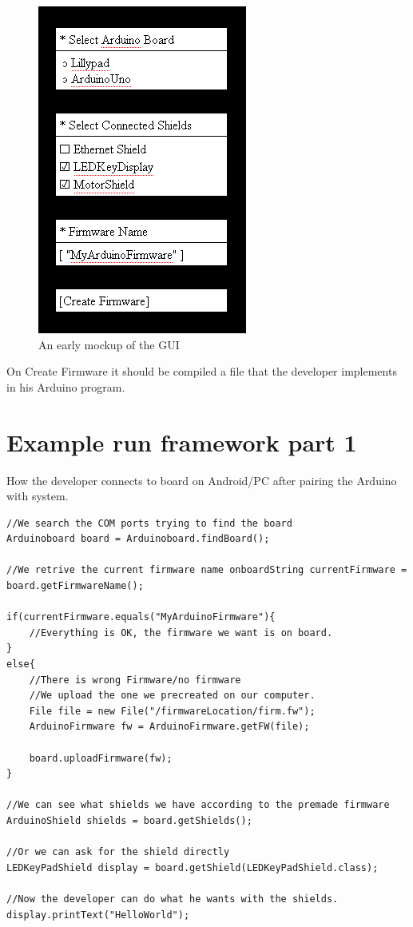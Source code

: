 \begin{figure}
	\centering
	\includegraphics{./img/architecture-mockupgui.png}
	\caption{An early mockup of the GUI}
	\label{fig:architecture-mockupgui}
\end{figure}

On Create Firmware it should be compiled a file that the developer implements in his Arduino program.

\section{Example run framework part 1}

How the developer connects to board on Android/PC after pairing the Arduino with system.

\javacode
\begin{lstlisting}
//We search the COM ports trying to find the board
Arduinoboard board = Arduinoboard.findBoard();

//We retrive the current firmware name onboardString currentFirmware = board.getFirmwareName();

if(currentFirmware.equals("MyArduinoFirmware"){
    //Everything is OK, the firmware we want is on board.
}
else{
    //There is wrong Firmware/no firmware
    //We upload the one we precreated on our computer.
    File file = new File("/firmwareLocation/firm.fw");
    ArduinoFirmware fw = ArduinoFirmware.getFW(file);

    board.uploadFirmware(fw);
}

//We can see what shields we have according to the premade firmware
ArduinoShield shields = board.getShields();

//Or we can ask for the shield directly
LEDKeyPadShield display = board.getShield(LEDKeyPadShield.class);

//Now the developer can do what he wants with the shields.
display.printText("HelloWorld");
\end{lstlisting}

